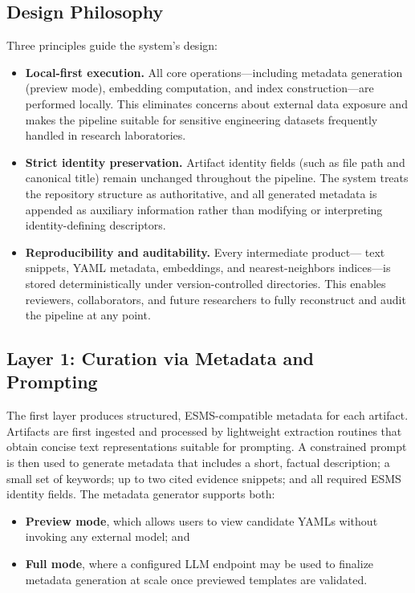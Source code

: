 \documentclass[12pt]{article}
\begin{document}
\subsection{Design Philosophy}

Three principles guide the system’s design:

\begin{itemize}
    \item \textbf{Local-first execution.} All core operations—including metadata 
    generation (preview mode), embedding computation, and index construction—are 
    performed locally. This eliminates concerns about external data exposure and 
    makes the pipeline suitable for sensitive engineering datasets frequently 
    handled in research laboratories.

    \item \textbf{Strict identity preservation.} Artifact identity fields (such as 
    file path and canonical title) remain unchanged throughout the pipeline. The 
    system treats the repository structure as authoritative, and all generated 
    metadata is appended as auxiliary information rather than modifying or 
    interpreting identity-defining descriptors.

    \item \textbf{Reproducibility and auditability.} Every intermediate product—
    text snippets, YAML metadata, embeddings, and nearest-neighbors indices—is 
    stored deterministically under version-controlled directories. This enables 
    reviewers, collaborators, and future researchers to fully reconstruct and 
    audit the pipeline at any point.
\end{itemize}

\subsection{Layer 1: Curation via Metadata and Prompting}

The first layer produces structured, ESMS-compatible metadata for each artifact. 
Artifacts are first ingested and processed by lightweight extraction routines 
that obtain concise text representations suitable for prompting. A constrained 
prompt is then used to generate metadata that includes a short, factual 
description; a small set of keywords; up to two cited evidence snippets; and 
all required ESMS identity fields. The metadata generator supports both:

\begin{itemize}
    \item \textbf{Preview mode}, which allows users to view candidate YAMLs 
    without invoking any external model; and
    \item \textbf{Full mode}, where a configured LLM endpoint may be used to 
    finalize metadata generation at scale once previewed templates are validated.
\end{itemize}
\end{document}
